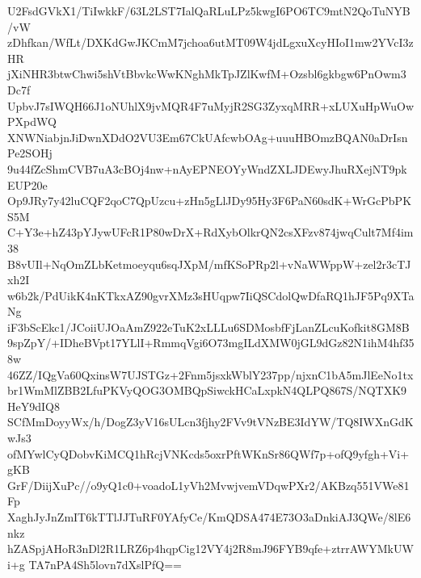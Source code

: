 U2FsdGVkX1/TiIwkkF/63L2LST7IalQaRLuLPz5kwgI6PO6TC9mtN2QoTuNYB/vW
zDhfkan/WfLt/DXKdGwJKCmM7jchoa6utMT09W4jdLgxuXcyHIoI1mw2YVcI3zHR
jXiNHR3btwChwi5shVtBbvkcWwKNghMkTpJZlKwfM+Ozsbl6gkbgw6PnOwm3Dc7f
UpbvJ7sIWQH66J1oNUhlX9jvMQR4F7uMyjR2SG3ZyxqMRR+xLUXuHpWuOwPXpdWQ
XNWNiabjnJiDwnXDdO2VU3Em67CkUAfcwbOAg+uuuHBOmzBQAN0aDrIsnPe2SOHj
9u44fZcShmCVB7uA3cBOj4nw+nAyEPNEOYyWndZXLJDEwyJhuRXejNT9pkEUP20e
Op9JRy7y42luCQF2qoC7QpUzcu+zHn5gLlJDy95Hy3F6PaN60sdK+WrGcPbPKS5M
C+Y3e+hZ43pYJywUFcR1P80wDrX+RdXybOlkrQN2csXFzv874jwqCult7Mf4im38
B8vUIl+NqOmZLbKetmoeyqu6sqJXpM/mfKSoPRp2l+vNaWWppW+zel2r3cTJxh2I
w6b2k/PdUikK4nKTkxAZ90gvrXMz3sHUqpw7IiQSCdolQwDfaRQ1hJF5Pq9XTaNg
iF3bScEkc1/JCoiiUJOaAmZ922eTuK2xLLLu6SDMosbfFjLanZLcuKofkit8GM8B
9spZpY/+IDheBVpt17YLlI+RmmqVgi6O73mgILdXMW0jGL9dGz82N1ihM4hf358w
46ZZ/IQgVa60QxinsW7UJSTGz+2Fnm5jsxkWblY237pp/njxnC1bA5mJlEeNo1tx
br1WmMlZBB2LfuPKVyQOG3OMBQpSiwckHCaLxpkN4QLPQ867S/NQTXK9HeY9dIQ8
SCfMmDoyyWx/h/DogZ3yV16sULcn3fjhy2FVv9tVNzBE3IdYW/TQ8IWXnGdKwJs3
ofMYwlCyQDobvKiMCQ1hRcjVNKcds5oxrPftWKnSr86QWf7p+ofQ9yfgh+Vi+gKB
GrF/DiijXuPc//o9yQ1c0+voadoL1yVh2MvwjvemVDqwPXr2/AKBzq551VWe81Fp
XaghJyJnZmIT6kTTlJJTuRF0YAfyCe/KmQDSA474E73O3aDnkiAJ3QWe/8lE6nkz
hZASpjAHoR3nDl2R1LRZ6p4hqpCig12VY4j2R8mJ96FYB9qfe+ztrrAWYMkUWi+g
TA7nPA4Sh5lovn7dXslPfQ==
